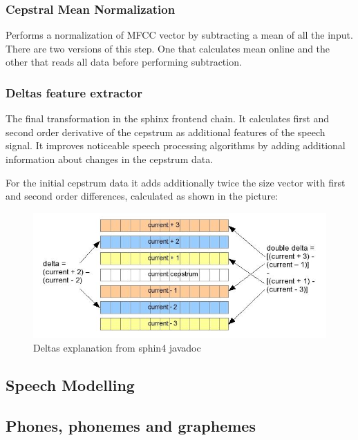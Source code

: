 \documentclass[12pt,a4paper,english]{article}
\begin{document}
\subsubsection{Cepstral Mean Normalization}

Performs a normalization of MFCC vector by subtracting a mean of all the input. There are two versions
of this step. One that calculates mean online and the other that reads all data before performing
subtraction.

\subsubsection{Deltas feature extractor}

The final transformation in the sphinx frontend chain. It calculates first and second order derivative of the
cepstrum as additional features of the speech signal. It improves noticeable speech processing algorithms
by adding additional information about changes in the cepstrum data. \newline

For the initial cepstrum data it adds additionally twice the size vector with first and second order
differences, calculated as shown in the picture:
\begin{figure}[hb]
    \centering
    \includegraphics[scale=0.6]{deltas_calc.jpg}
    \caption[]{Deltas explanation from sphin4 javadoc}
\end{figure}

\newpage
\begin{center}
    \section{Speech Modelling}
\end {center}
\setcounter{equation}{0}

\subsection{Phones, phonemes and graphemes}
\end{document}
